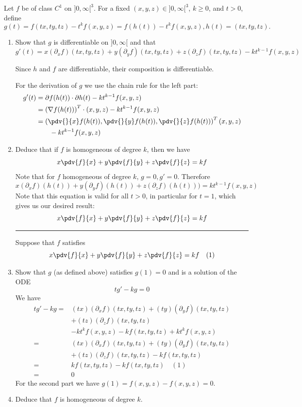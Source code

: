 \documentclass[a4paper,fontsize = 10pt]{article}
\begin{document}
\vspace{0.2cm}

Let $f$ be of class $C^1$ on $]0, \infty[^3$. For a fixed $(x, y, z) \in ]0, \infty[^3$, $k \geq 0$, and $t > 0$, define 
\[g(t) = f(tx, ty, tz) - t^kf(x,y,z) = f(h(t)) - t^kf(x,y,z), h(t) = (tx,ty,tz).\]
\begin{enumerate}[label=(\alph*)]
  \item Show that $g$ is differentiable on $]0, \infty[$ and that\\ 
  \(g'(t) = x(\partial_xf)(tx,ty,tz)+y(\partial_y f)(tx,ty,tz) + z (\partial_z f)(tx,ty,tz) - k t^{k-1}f(x,y,z)\)

  Since $h$ and $f$ are differentiable, their composition is differentiable.

  For the derivation of $g$ we use the chain rule for the left part:
  \begin{align*}
    g'(t) &= \partial f(h(t)) \cdot \partial h(t) - kt^{k-1}f(x,y,z)\\
    &= \left(\nabla f(h(t))\right)^T \cdot (x,y,z) - kt^{k-1}f(x,y,z)\\
    &= \left(\pdv{}{x}f(h(t)), \pdv{}{y}f(h(t)), \pdv{}{z}f(h(t))\right)^T (x,y,z) \\& \qquad - kt^{k-1}f(x,y,z)
  \end{align*}



  \item Deduce that if $f$ is homogeneous of degree $k$, then we have
  \[x \pdv{f}{x} + y \pdv{f}{y} + z \pdv{f}{z} = kf\]
  Note that for $f$ homogeneous of degree $k$, $g = 0, g' = 0$. Therefore
  \[ x(\partial_xf)(h(t))+y(\partial_y f)(h(t)) + z (\partial_z f)(h(t))) = k t^{k-1}f(x,y,z)\]
  Note that this equation is valid for all $t > 0$, in particular for $t = 1$, which gives us our desired result:
  \[x \pdv{f}{x} + y \pdv{f}{y} + z \pdv{f}{z} = kf\]
  \vspace{0.1cm}
  \hrule
  \vspace{0.2cm}
  Suppose that $f$ satisfies 
  \[x \pdv{f}{x} + y \pdv{f}{y} + z \pdv{f}{z} = kf \quad (1)\]
  \item Show that $g$ (as defined above) satisfies $g(1) = 0$ and is a solution of the ODE 
  \[tg' - kg = 0\] 
  We have 
  \begin{align*}
    tg' - kg =& (tx)(\partial_xf)(tx,ty,tz)+(ty)(\partial_y f)(tx,ty,tz)\\ 
    &+ (tz) (\partial_z f)(tx,ty,tz)\\ 
    &- k t^{k}f(x,y,z) - kf(tx,ty,tz) + k t^kf(x,y,z)\\
    =& (tx)(\partial_xf)(tx,ty,tz)+(ty)(\partial_y f)(tx,ty,tz)\\ 
    &+ (tz) (\partial_z f)(tx,ty,tz) - kf(tx,ty,tz)\\
    =& kf(tx,ty,tz) - kf(tx,ty,tz) \quad (1)\\
    =& 0
  \end{align*}
  For the second part we have $g(1) = f(x,y,z) -f(x,y,z) = 0$.
  \item Deduce that $f$ is homogeneous of degree $k$.
  

\end{enumerate}
\end{document}
